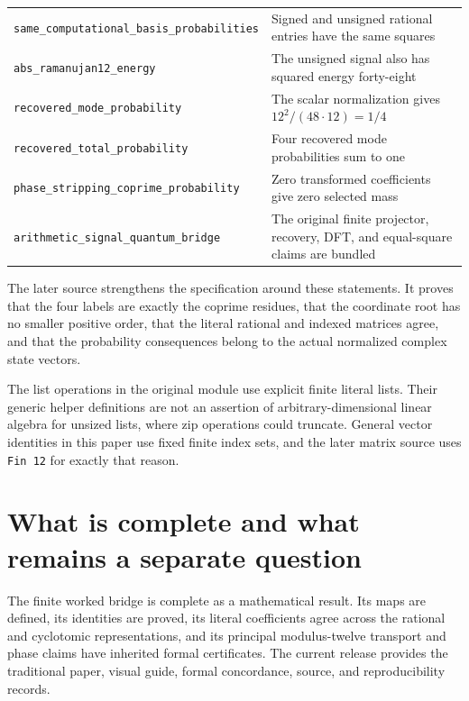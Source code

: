 {\begin{longtable}[]{@{}
  >{\raggedright\arraybackslash}p{}
  >{\raggedright\arraybackslash}p{}@{}}
\texttt{same\_computational\_basis\_probabilities} & Signed and unsigned
rational entries have the same squares \\
\texttt{abs\_ramanujan12\_energy} & The unsigned signal also has squared
energy forty-eight \\
\texttt{recovered\_mode\_probability} & The scalar normalization gives
\(12^2/(48\cdot12)=1/4\) \\
\texttt{recovered\_total\_probability} & Four recovered mode
probabilities sum to one \\
\texttt{phase\_stripping\_coprime\_probability} & Zero transformed
coefficients give zero selected mass \\
\texttt{arithmetic\_signal\_quantum\_bridge} & The original finite
projector, recovery, DFT, and equal-square claims are bundled \\
\end{longtable}}

The later source strengthens the specification around these statements.
It proves that the four labels are exactly the coprime residues, that
the coordinate root has no smaller positive order, that the literal
rational and indexed matrices agree, and that the probability
consequences belong to the actual normalized complex state vectors.

The list operations in the original module use explicit finite literal
lists. Their generic helper definitions are not an assertion of
arbitrary-dimensional linear algebra for unsized lists, where zip
operations could truncate. General vector identities in this paper use
fixed finite index sets, and the later matrix source uses
\texttt{Fin\ 12} for exactly that reason.

\hypertarget{what-is-complete-and-what-remains-a-separate-question}{%
\section{What is complete and what remains a separate
question}\label{what-is-complete-and-what-remains-a-separate-question}}

The finite worked bridge is complete as a mathematical result. Its maps
are defined, its identities are proved, its literal coefficients agree
across the rational and cyclotomic representations, and its principal
modulus-twelve transport and phase claims have inherited formal
certificates. The current release provides the traditional paper, visual
guide, formal concordance, source, and reproducibility records.

